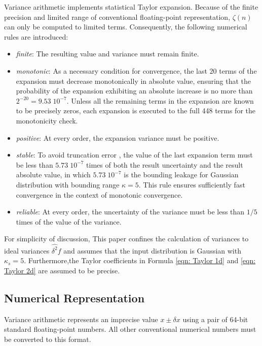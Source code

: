 \documentclass[twoside]{article}
\numberwithin{equation}{section}
\begin{document}
Variance arithmetic implements statistical Taylor expansion.
Because of the finite precision and limited range of conventional floating-point representation, $\zeta(n)$ can only be computed to limited terms.
Consequently, the following numerical rules are introduced:
\begin{itemize}
\item \emph{finite}: The resulting value and variance must remain finite.

\item \emph{monotonic}: As a necessary condition for convergence, the last $20$ terms of the expansion must decrease monotonically in absolute value, ensuring that the probability of the expansion exhibiting an absolute increase is no more than $2^{-20} = 9.53\; 10^{-7}$.
Unless all the remaining terms in the expansion are known to be precisely zeros, each expansion is executed to the full 448 terms for the monotonicity check.

\item \emph{positive}: At every order, the expansion variance must be positive.

\item \emph{stable}: To avoid truncation error \cite{Numerical_Recipes}, the value of the last expansion term must be less than $5.73\;10^{-7}$ times of both the result uncertainty and the result absolute value, in which $5.73\;10^{-7}$ is the bounding leakage for Gaussian distribution with bounding range $\kappa = 5$.
This rule ensures sufficiently fast convergence in the context of monotonic convergence.

\item \emph{reliable}: At every order, the uncertainty of the variance must be less than $1/5$ times of the value of the variance.

\end{itemize}

For simplicity of discussion, This paper confines the calculation of variances to ideal variances $\widehat{\delta^2} f$ and assumes that the input distribution is Gaussian with $\kappa_s = 5$.
Furthermore,the Taylor coefficients in Formula \eqref{eqn: Taylor 1d} and \eqref{eqn: Taylor 2d} are assumed to be precise.


\subsection{Numerical Representation}

Variance arithmetic represents an imprecise value $x \pm \delta x$ using a pair of 64-bit standard floating-point numbers.
All other conventional numerical numbers must be converted to this format.
\end{document}
